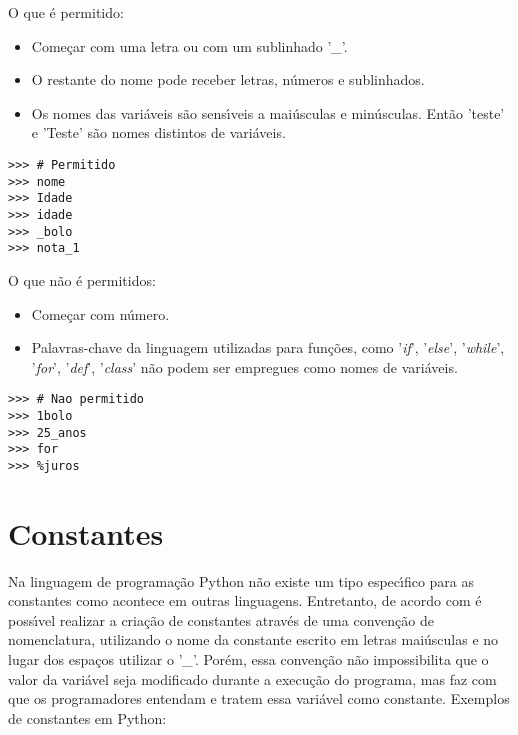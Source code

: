O que \'{e} permitido:
	\begin{itemize}
		\item Come\c{c}ar com uma letra ou com um sublinhado '\textsl{\_}'.
		\item O restante do nome pode receber letras, n\'{u}meros e sublinhados.
		\item Os nomes das vari\'{a}veis s\~{a}o sens\'{\i}veis a mai\'{u}sculas e min\'{u}sculas. Ent\~{a}o 'teste' e 'Teste' s\~{a}o nomes distintos de vari\'{a}veis.
	\end{itemize}
		
\begin{lstlisting}
>>> # Permitido
>>> nome
>>> Idade
>>> idade
>>> _bolo
>>> nota_1
\end{lstlisting}
		
		
O que n\~{a}o \'{e} permitidos:
	\begin{itemize}
		\item Come\c{c}ar com n\'{u}mero.
		\item Palavras-chave da linguagem utilizadas para fun\c{c}\~{o}es, como '\textsl{if}', '\textsl{else}', '\textsl{while}', '\textsl{for}', '\textsl{def}', '\textsl{class}' n\~{a}o podem ser empregues como nomes de vari\'{a}veis.
	\end{itemize}
		
\begin{lstlisting}
>>> # Nao permitido
>>> 1bolo
>>> 25_anos
>>> for
>>> %juros
\end{lstlisting}

	\section{Constantes}
Na linguagem de programa\c{c}\~{a}o Python n\~{a}o existe um tipo espec\'{\i}fico para as constantes como acontece em outras linguagens. Entretanto, de acordo com \cite{Sousa2020} \'{e} poss\'{\i}vel realizar a cria\c{c}\~{a}o de constantes atrav\'{e}s de uma conven\c{c}\~{a}o de nomenclatura, utilizando o nome da constante escrito em letras mai\'{u}sculas e no lugar dos espa\c{c}os utilizar o '\textsl{\_}'. Por\'{e}m, essa conven\c{c}\~{a}o n\~{a}o impossibilita que o valor da vari\'{a}vel seja modificado durante a execu\c{c}\~{a}o do programa, mas faz com que os programadores entendam e tratem essa vari\'{a}vel como constante. Exemplos de constantes em Python:

